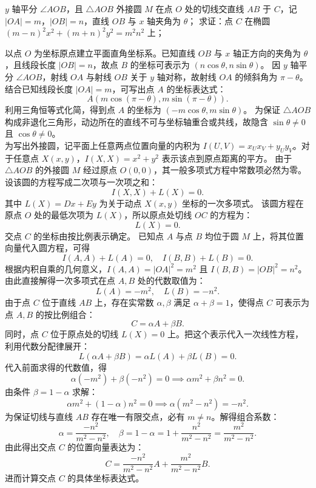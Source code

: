 \begin{example}
$y$ 轴平分 $\angle AOB$，且 $\triangle AOB$ 外接圆 $M$ 在点 $O$ 处的切线交直线 $AB$ 于 $C$，记 $|OA| = m$，$|OB| = n$，直线 $OB$ 与 $x$ 轴夹角为 $\theta$；
求证：点 $C$ 在椭圆 $(m-n)^2x^2 + (m+n)^2y^2 = m^2n^2$ 上；
\end{example}
\begin{solution}
以点 $O$ 为坐标原点建立平面直角坐标系。已知直线 $OB$ 与 $x$ 轴正方向的夹角为 $\theta$，且线段长度 $|OB| = n$，故点 $B$ 的坐标可表示为 $(n\cos\theta, n\sin\theta)$。
因 $y$ 轴平分 $\angle AOB$，射线 $OA$ 与射线 $OB$ 关于 $y$ 轴对称，故射线 $OA$ 的倾斜角为 $\pi-\theta$。
结合已知线段长度 $|OA| = m$，可写出点 $A$ 的坐标表达式：
\[ A(m\cos(\pi-\theta), m\sin(\pi-\theta)). \]
利用三角恒等式化简，得到点 $A$ 的坐标为 $(-m\cos\theta, m\sin\theta)$。
为保证 $\triangle AOB$ 构成非退化三角形，动边所在的直线不可与坐标轴重合或共线，故隐含 $\sin\theta \neq 0$ 且 $\cos\theta \neq 0$。\\
为写出外接圆，记平面上任意两点位置向量的内积为 $I(U, V) = x_U x_V + y_U y_V$。对于任意点 $X(x,y)$，$I(X, X) = x^2 + y^2$ 表示该点到原点距离的平方。
由于 $\triangle AOB$ 的外接圆 $M$ 经过原点 $O(0,0)$，其一般多项式方程中常数项必然为零。设该圆的方程写成二次项与一次项之和：
\[ I(X, X) + L(X) = 0. \]
其中 $L(X) = Dx + Ey$ 为关于动点 $X(x,y)$ 坐标的一次多项式。
该圆方程在原点 $O$ 处的最低次项为 $L(X)$，所以原点处切线 $OC$ 的方程为：
\[ L(X) = 0. \]
交点 $C$ 的坐标由按比例表示确定。
已知点 $A$ 与点 $B$ 均位于圆 $M$ 上，将其位置向量代入圆方程，可得
\[ I(A, A) + L(A) = 0, \quad I(B, B) + L(B) = 0. \]
根据内积自乘的几何意义，$I(A, A) = |OA|^2 = m^2$ 且 $I(B, B) = |OB|^2 = n^2$。
由此直接解得一次多项式在点 $A, B$ 处的代数取值为：
\[ L(A) = -m^2, \quad L(B) = -n^2. \]
由于点 $C$ 位于直线 $AB$ 上，存在实常数 $\alpha, \beta$ 满足 $\alpha + \beta = 1$，使得点 $C$ 可表示为点 $A, B$ 的按比例组合：
\[ C = \alpha A + \beta B. \]
同时，点 $C$ 位于原点处的切线 $L(X) = 0$ 上。把这个表示代入一次线性方程，利用代数分配律展开：
\[ L(\alpha A + \beta B) = \alpha L(A) + \beta L(B) = 0. \]
代入前面求得的代数值，得
\[ \alpha(-m^2) + \beta(-n^2) = 0 \implies \alpha m^2 + \beta n^2 = 0. \]
由条件 $\beta = 1 - \alpha$ 求解：
\[ \alpha m^2 + (1 - \alpha) n^2 = 0 \implies \alpha(m^2 - n^2) = -n^2. \]
为保证切线与直线 $AB$ 存在唯一有限交点，必有 $m \neq n$。解得组合系数：
\[ \alpha = \frac{-n^2}{m^2 - n^2}, \quad \beta = 1 - \alpha = 1 + \frac{n^2}{m^2 - n^2} = \frac{m^2}{m^2 - n^2}. \]
由此得出交点 $C$ 的位置向量表达为：
\[ C = \frac{-n^2}{m^2 - n^2} A + \frac{m^2}{m^2 - n^2} B. \]
进而计算交点 $C$ 的具体坐标表达式。

\end{solution}
